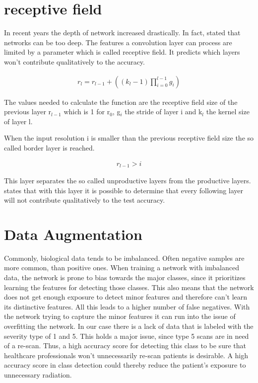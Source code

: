 \documentclass[
a4paper, 
12pt,
grayscalebody, %
abstract=on,
twoside, BCOR10mm, 12pt, DIV13,headinclude, footexclude, final, abstracton, openright
]{ibireprt}
\numberwithin{equation}{chapter}
\numberwithin{table}{chapter}
\numberwithin{figure}{chapter}
\numberwithin{algorithm}{chapter}
\numberwithin{example}{chapter}
\numberwithin{example}{chapter}
\begin{document}
\section{receptive field}
In recent years the depth of network increased drastically. In fact, \cite{Richter2021} stated that networks can be too deep. The features a convolution layer can process are limited by a parameter which is called receptive field. It predicts which layers won't contribute qualitatively to the accuracy.

\begin{align}
	r_l = r_{l-1}+((k_l-1)\prod_{i=0}^{l-1}g_i)
\end{align}

The values needed to calculate the function are the receptive field size of the previous layer r$_{l-1}$ which is 1 for r$_0$, g$_i$ the stride of layer i and k$_l$ the kernel size of layer l.

When the input resolution i is smaller than the previous receptive field size the so called border layer is reached.

\begin{align}
	r_{l-1} > i
\end{align} 

This layer separates the so called unproductive layers from the productive layers. \cite{Richter2021} states that with this layer it is possible to determine that every following layer will not contribute qualitatively to the test accuracy.

\section{Data Augmentation}
Commonly, biological data tends to be imbalanced. Often negative samples are more common, than positive ones. \cite{Alzubaidi2021} When training a network with imbalanced data, the network is prone to bias towards the major classes, since it prioritizes learning the features for detecting those classes. This also means that the network does not get enough exposure to detect minor features and therefore can't learn its distinctive features. All this leads to a higher number of false negatives. With the network trying to capture the minor features it can run into the issue of overfitting the network. In our case there is a lack of data that is labeled with the severity type of 1 and 5. This holds a major issue, since type 5 scans are in need of a re-scan. Thus, a high accuracy score for detecting this class to be sure that healthcare professionals won't unnecessarily re-scan patients is desirable. A high accuracy score in class detection could thereby reduce the patient's exposure to unnecessary radiation.%
\end{document}
